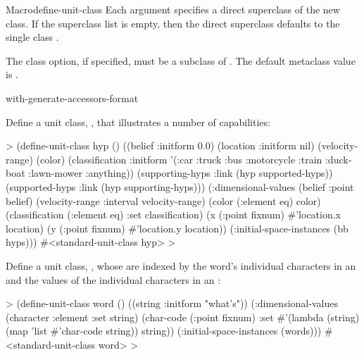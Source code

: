\documentclass[10pt,twoside,english,pdftex]{article}
\begin{document}
\begin{functiondoc}{Macro}{define-unit-class}
%
Each  argument specifies a direct superclass of the new
class. If the superclass list is empty, then the direct superclass defaults to
the single class .

%
The  class option, if specified, must be a subclass of
.  The default metaclass
value is .

\classoptioninheritance

\begin{alsos}{with-generate-accessors-format}
\end{alsos}

\fnexamples
%
Define a unit class, , that illustrates a number of
 capabilities:
%
\W\supp
\begin{example}
  > (define-unit-class hyp ()
      ((belief :initform 0.0)
       (location :initform nil)
       (velocity-range)
       (color)
       (classification :initform '(:car :truck :bus :motorcycle :train :duck-boat 
                                   :lawn-mower :anything))
       (supporting-hyps 
        :link (hyp supported-hyps))
       (supported-hyps 
        :link (hyp supporting-hyps)))
      (:dimensional-values 
       (belief :point belief)
       (velocity-range :interval velocity-range)
       (color (:element eq) color)
       (classification (:element eq) :set classification)
       (x (:point fixnum) #'location.x location)
       (y (:point fixnum) #'location.y location))
      (:initial-space-instances (bb hyps)))
  #<standard-unit-class hyp>
  >
\end{example}

Define a unit class, , whose  are indexed by the
word's individual characters in an  and the
 values of the individual characters in an
:
%
\W\supp
\begin{example}
  > (define-unit-class word ()
      ((string :initform "what's"))
      (:dimensional-values
       (character :element :set string)
       (char-code (:point fixnum) :set 
                  #'(lambda (string)
                      (map 'list #'char-code string))
                  string))
      (:initial-space-instances (words)))
  #<standard-unit-class word>
  >
\end{example}

\end{functiondoc}
\end{document}
